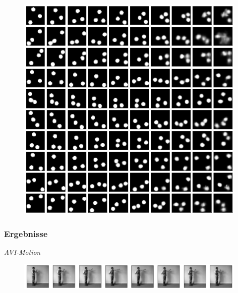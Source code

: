\begin{frame}
\begin{figure}[h!]
\begin{minipage}{0.35\textwidth}
		\includegraphics[scale=0.19]{Bilder/bouncingBalls_ODE}
	\end{minipage}
\end{figure}
\end{frame}




\begin{frame}
\frametitle{Ergebnisse}
\emph{AVI-Motion}
\begin{figure}[!htbp]
	\centering
	\includegraphics[scale=0.35]{Bilder/AVIMotion}
\end{figure}
\end{frame}




